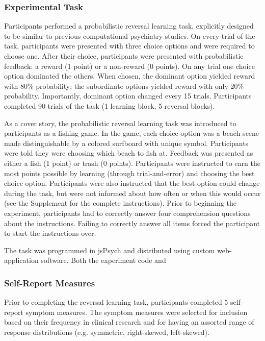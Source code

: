 \documentclass[a4paper,notitlepage,12pt]{article}
\begin{document}
\subsubsection{Experimental Task}

Participants performed a probabilistic reversal learning task, explicitly designed to be similar to previous computational psychiatry studies. On every trial of the task, participants were presented with three choice options and were required to choose one. After their choice, participants were presented with probabilistic feedback: a reward (1 point) or a non-reward (0 points). On any trial one choice option dominated the others. When chosen, the dominant option yielded reward with 80\% probability; the subordinate options yielded reward with only 20\% probability. Importantly, dominant option changed every 15 trials. Participants completed 90 trials of the task (1 learning block, 5 reversal blocks). 

As a cover story, the probabilistic reversal learning task was introduced to participants as a fishing game. In the game, each choice option was a beach scene made distinguishable by a colored surfboard with unique symbol. Participants were told they were choosing which beach to fish at. Feedback was presented as either a fish (1 point) or trash (0 points). Participants were instructed to earn the most points possible by learning (through trial-and-error) and choosing the best choice option. Participants were also instructed that the best option could change during the task, but were not informed about how often or when this would occur (see the Supplement for the complete instructions). Prior to beginning the experiment, participants had to correctly answer four comprehension questions about the instructions. Failing to correctly answer all items forced the participant to start the instructions over.

The task was programmed in jsPsych and distributed using custom web-application software. Both the experiment code and 

\subsubsection{Self-Report Measures}

Prior to completing the reversal learning task, participants completed 5 self-report symptom measures. The symptom measures were selected for inclusion based on their frequency in clinical research and for having an assorted range of response distributions (e.g. symmetric, right-skewed, left-skewed).
\end{document}
